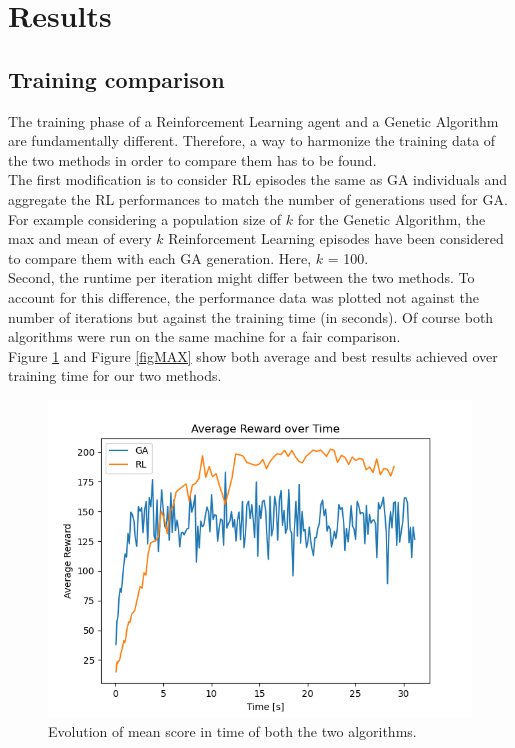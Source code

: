 \section{Results}

\subsection{Training comparison}

The training phase of a Reinforcement Learning agent and a Genetic Algorithm are fundamentally different.
Therefore, a way to harmonize the training data of the two methods in order to compare them has to be found.
\\
The first modification is to consider RL episodes the same as GA individuals and aggregate the RL performances to match the number of generations used for GA.
For example considering a population size of $k$ for the Genetic Algorithm, the max and mean of every $k$ Reinforcement Learning episodes have been considered to compare them with each GA generation. Here, $k$ = 100.
\\
Second, the runtime per iteration might differ between the two methods. To account for this difference, the performance data was plotted not against the number of iterations but against the training time (in seconds).
Of course both algorithms were run on the same machine for a fair comparison.
\\
Figure \ref{figAVG} and Figure \ref{figMAX} show both average and best results achieved over training time for our two methods.

\begin{figure}[H]
	\centering
	\includegraphics [scale = 0.5]{Images/RL_GA_comparison_avg.png}
	\caption{Evolution of mean score in time of both the two algorithms.}
	\label{figAVG}
\end{figure}

